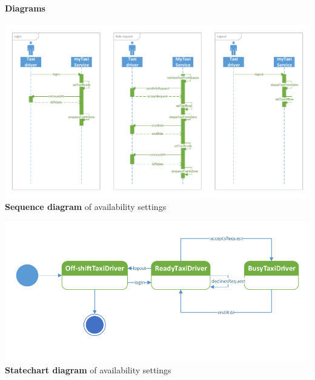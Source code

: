 	\paragraph{Diagrams}
		\begin{center}
			\includegraphics[width=\textwidth]{diagrams/availability}
			\textbf{Sequence diagram} of availability settings
		\end{center}
		\begin{center}
			\includegraphics[width=\textwidth]{diagrams/availability_state}
			\textbf{Statechart diagram} of availability settings
		\end{center}
		
